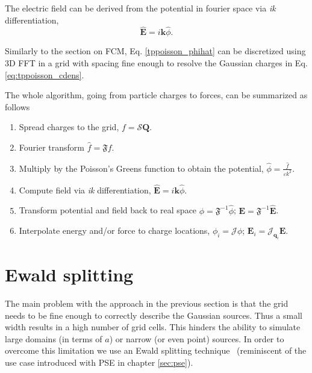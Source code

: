 \documentclass[twoside,openright,titlepage,numbers=noenddot,%
headinclude,footinclude,cleardoublepage=empty,abstract=on,
BCOR=5mm,fontsize=11pt, dvipsnames, paper=b5
]{scrreprt}
\renewcommand{\vec}[1]{\bm{#1}}
\newcommand{\oper}[1]{\mathcal{#1}}
\newcommand{\fou}[1]{\widehat{#1}}
\newcommand{\ppos}{q}
\begin{document}
The electric field can be derived from the potential in fourier space via \emph{ik} differentiation,
\begin{equation}
    \label{tppoisson_ehat}
  \hat{\vec{E}} = i\vec{k}\hat{\phi}.
\end{equation}

Similarly to the section on \gls{FCM}, Eq. \eqref{tppoisson_phihat} can be discretized using 3D \gls{FFT} in a grid with spacing fine enough to resolve the Gaussian charges in Eq. \eqref{eq:tppoisson_cdens}.

The whole algorithm, going from particle charges to forces, can be summarized as follows
\begin{enumerate}
\item Spread charges to the grid, $f=\oper{S}\vec{Q}$.
\item Fourier transform $\hat{f} = \mathfrak{F}f$.
\item Multiply by the Poisson's Greens function to obtain the potential, $\fou{\phi} = \frac{\hat{f}}{\varepsilon k^2}$.
\item Compute field via \emph{ik} differentiation, $\fou{\vec{E}} = i\vec{k}\fou\phi$.
\item Transform potential and field back to real space $\phi = \mathfrak{F}^{-1}\fou\phi$; $\vec{E} = \mathfrak{F}^{-1}\fou{\vec{E}}$.
\item Interpolate energy and/or force to charge locations, $\phi_i = \oper{J}\phi$; $\vec{E}_i = \oper{J}_{\vec{\ppos}_i}\vec{E}$.
\end{enumerate}
\section{Ewald splitting}\label{sec:tppoisson_ewald}
The main problem with the approach in the previous section is that the grid needs to be fine enough to correctly describe the Gaussian sources. Thus a small width results in a high number of grid cells. This hinders the ability to simulate large domains (in terms of $a$) or narrow (or even point) sources. In order to overcome this limitation we use an Ewald splitting technique~\cite{Tornberg2015} (reminiscent of the use case introduced with \gls{PSE} in chapter \ref{sec:pse}).
\end{document}
